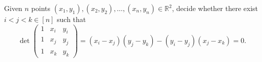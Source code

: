 \begin{problem}
	Given \(n\) points \((x_1,y_1), (x_2,y_2), \ldots, (x_n,y_n) \in \mathbb{R}^2\), decide
	whether there exist \(i < j < k \in [n]\) such that
	\begin{displaymath}
		\det
		\left(
		\begin{matrix}
		1 & x_i & y_i \\
		1 & x_j & y_j \\
		1 & x_k & y_k
		\end{matrix}
		\right)
		=
		(x_i - x_j)(y_j - y_k) - (y_i - y_j)(x_j - x_k)
		= 0.
	\end{displaymath}
\end{problem}
